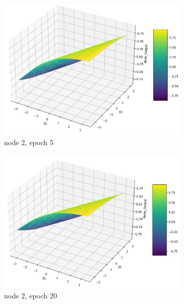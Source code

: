 \documentclass[11pt]{article}
\begin{document}
\begin{figure}[h]
\begin{subfigure}[b]{0.18\textwidth}
	\includegraphics[scale=0.14]{hidden1_n2_e5.jpg}
	\caption{node 2, epoch 5}
	\label{fig:fig2.1.4.7}
	\end{subfigure}
	\begin{subfigure}[b]{0.18\textwidth}
	\centering
	\includegraphics[scale=0.14]{hidden1_n2_e20.jpg}
	\caption{node 2, epoch 20}
	\label{fig:fig2.1.4.8}
	\end{subfigure}
	\begin{subfigure}[b]{0.18\textwidth}
	\centering

\end{subfigure}
\end{figure}
\end{document}
